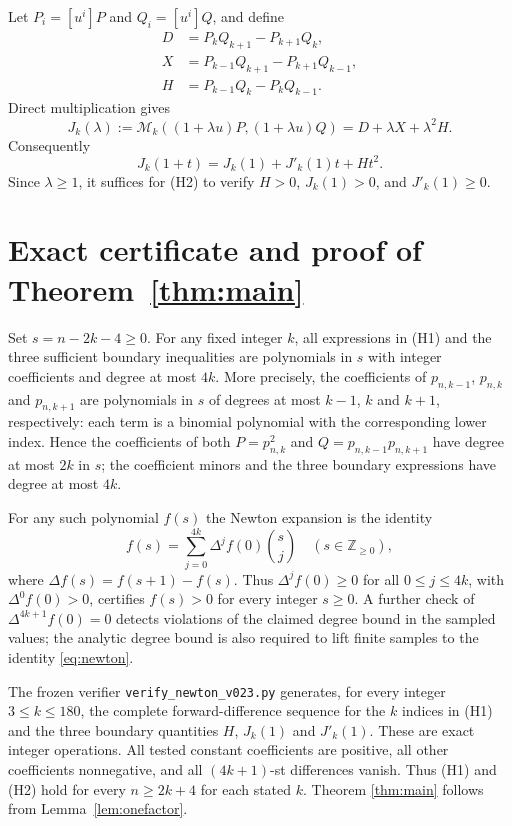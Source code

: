 \documentclass[11pt,a4paper]{article}
\newcommand{\coef}[2]{[u^{#1}]#2}
\newcommand{\M}{\mathcal M}
\begin{document}
Let $P_i=\coef{i}{P}$ and $Q_i=\coef{i}{Q}$, and define
\begin{align*}
D&=P_kQ_{k+1}-P_{k+1}Q_k,\\
X&=P_{k-1}Q_{k+1}-P_{k+1}Q_{k-1},\\
H&=P_{k-1}Q_k-P_kQ_{k-1}.
\end{align*}
Direct multiplication gives
\begin{equation}\label{eq:J}
J_k(\lambda):=\M_k((1+\lambda u)P,(1+\lambda u)Q)
=D+\lambda X+\lambda^2H.
\end{equation}
Consequently
\begin{equation}\label{eq:Jplus}
J_k(1+t)=J_k(1)+J'_k(1)t+Ht^2.
\end{equation}
Since $\lambda\ge1$, it suffices for (H2) to verify
$H>0$, $J_k(1)>0$, and $J'_k(1)\ge0$.

\section{Exact certificate and proof of Theorem~\ref{thm:main}}
Set $s=n-2k-4\ge0$. For any fixed integer $k$, all expressions in
(H1) and the three sufficient boundary inequalities are polynomials
in $s$ with integer coefficients and degree at most $4k$.
More precisely, the coefficients of $p_{n,k-1}$, $p_{n,k}$ and
$p_{n,k+1}$ are polynomials in $s$ of degrees at most $k-1$, $k$
and $k+1$, respectively: each term is a binomial polynomial with
the corresponding lower index. Hence the coefficients of both
$P=p_{n,k}^2$ and $Q=p_{n,k-1}p_{n,k+1}$ have degree at most $2k$
in $s$; the coefficient minors and the three boundary expressions
have degree at most $4k$.

For any such polynomial $f(s)$ the Newton expansion is the identity
\begin{equation}\label{eq:newton}
 f(s)=\sum_{j=0}^{4k}\Delta^jf(0)\binom{s}{j}
 \quad(s\in\mathbb Z_{\ge0}),
\end{equation}
where $\Delta f(s)=f(s+1)-f(s)$. Thus
$\Delta^jf(0)\ge0$ for all $0\le j\le4k$, with
$\Delta^0f(0)>0$, certifies $f(s)>0$ for every integer $s\ge0$.
A further check of $\Delta^{4k+1}f(0)=0$ detects violations of the
claimed degree bound in the sampled values; the analytic degree bound
is also required to lift finite samples to the identity
\eqref{eq:newton}.

The frozen verifier \texttt{verify\_newton\_v023.py} generates, for every
integer $3\le k\le180$, the complete forward-difference sequence
for the $k$ indices in (H1) and the three boundary quantities
$H$, $J_k(1)$ and $J'_k(1)$. These are exact integer operations.
All tested constant coefficients are positive, all other coefficients
nonnegative, and all $(4k+1)$-st differences vanish. Thus (H1) and
(H2) hold for every $n\ge2k+4$ for each stated $k$. Theorem
\ref{thm:main} follows from Lemma~\ref{lem:onefactor}.
\end{document}
